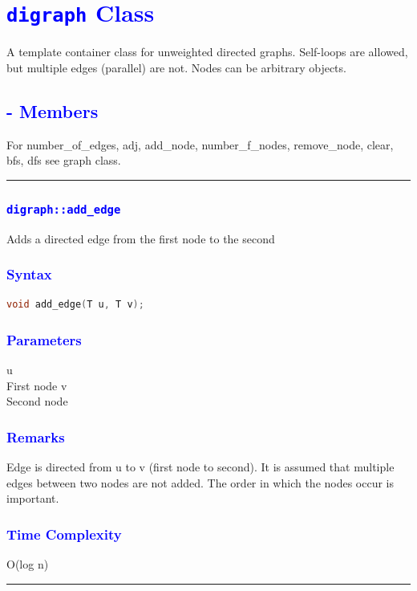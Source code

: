 \documentclass[11pt,a4paper]{article}
\begin{document}
\section*{\textcolor{blue}{{\huge \texttt{digraph} Class}} }
A template container class for unweighted directed graphs. Self-loops are allowed, but multiple edges (parallel) are not. Nodes can be arbitrary objects.

\subsection*{\textcolor{blue}{{\LARGE - Members}}}
For number\_of\_edges, adj, add\_node, number\_f\_nodes, remove\_node, clear, bfs, dfs see graph class.

\rule{17cm}{0.1mm}


\subsubsection*{\textcolor{blue}{\Large\texttt{digraph::add\_edge}}}
Adds a directed edge from the first node to the second
\subsubsection*{\textcolor{blue}{ \large {Syntax}}}
\begin{lstlisting}[language=C++]
void add_edge(T u, T v);
\end{lstlisting}
\subsubsection*{\textcolor{blue}{ \large {Parameters}}}
u \\
First node
v\\
Second node

\subsubsection*{\textcolor{blue}{ \large {Remarks}}}
Edge is directed from u to v (first node to second). It is assumed that multiple edges between two nodes are not added. The order in which the nodes occur is important.



\subsubsection*{\textcolor{blue}{ \large {Time Complexity}}}
O(log n)
\\
\rule{17cm}{0.1mm}
\end{document}
